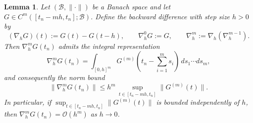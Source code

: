 \documentclass[12pt]{article}
\newtheorem{lem}{Lemma}
\begin{document}
\begin{lem}
\label{lem:diff-deriv}
Let $(\mathcal{B},\|\cdot\|)$ be a Banach space and let $G\in C^{m}([t_n-mh,t_n];\mathcal{B})$.
Define the backward difference with step size $h>0$ by
\begin{equation*}
(\nabla_h G)(t):=G(t)-G(t-h),\qquad \nabla_h^{0}G:=G,\qquad \nabla_h^{m}:=\nabla_h(\nabla_h^{m-1}).
\end{equation*}
Then $\nabla_h^{m}G(t_n)$ admits the integral representation
\begin{equation}
\label{eq:diff-int-rep}
\nabla_h^{m}G(t_n)
= \int_{[0,h]^m} G^{(m)}\!\left(t_n-\sum_{i=1}^m s_i\right)\,ds_1\cdots ds_m,
\end{equation}
and consequently the norm bound
\begin{equation}
\label{eq:diff-deriv-bound}
\|\nabla_h^{m}G(t_n)\|
\le h^{m}\,\sup_{t\in[t_n-mh,t_n]}\|G^{(m)}(t)\|.
\end{equation}
In particular, if $\sup_{t\in[t_n-mh,t_n]}\|G^{(m)}(t)\|$ is bounded independently of $h$,
then $\nabla_h^{m}G(t_n)=\mathcal{O}(h^{m})$ as $h\to 0$.
\end{lem}
\end{document}
